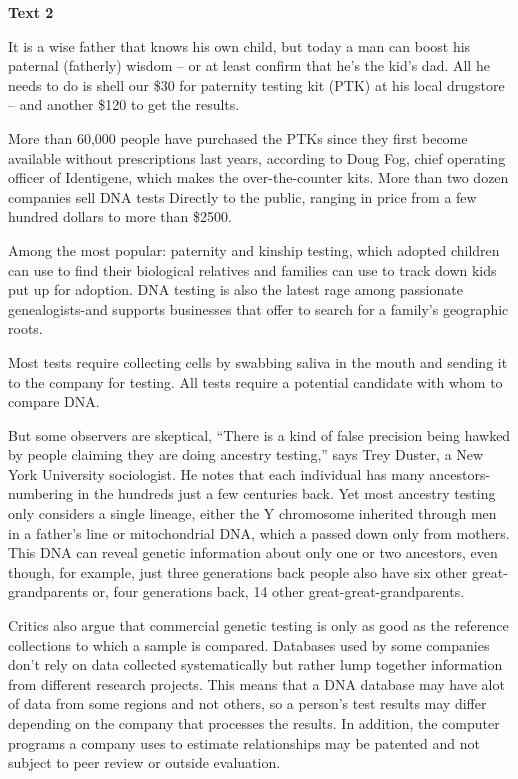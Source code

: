 
\begin{center}\textbf{Text 2}\end{center}

\qquad It is a wise father that knows his own child, but today a man can boost his paternal (fatherly) wisdom – or at least confirm that he's the kid's dad. All he needs to do is shell our \$30 for paternity testing kit (PTK) at his local drugstore – and another \$120 to get the results.

\qquad More than 60,000 people have purchased the PTKs since they first become available without prescriptions last years, according to Doug Fog, chief operating officer of Identigene, which makes the over-the-counter kits. More than two dozen companies sell DNA tests Directly to the public, ranging in price from a few hundred dollars to more than \$2500.

\qquad Among the most popular: paternity and kinship testing, which adopted children can use to find their biological relatives and families can use to track down kids put up for adoption. DNA testing is also the latest rage among passionate genealogists-and supports businesses that offer to search for a family's geographic roots.

\qquad Most tests require collecting cells by swabbing saliva in the mouth and sending it to the company for testing.  All tests require a potential candidate with whom to compare DNA.

\qquad But some observers are skeptical, ``There is a kind of false precision being hawked by people claiming they are doing ancestry testing,'' says Trey Duster, a New York University sociologist. He notes that each individual has many ancestors-numbering in the hundreds just a few centuries back. Yet most ancestry testing only considers a single lineage, either the Y chromosome inherited through men in a father's line or mitochondrial DNA, which a passed down only from mothers. This DNA can reveal genetic information about only one or two ancestors, even though, for example, just three generations back people also have six other great-grandparents or, four generations back, 14 other great-great-grandparents.

\qquad Critics also argue that commercial genetic testing is only as good as the reference collections to which a sample is compared. Databases used by some companies don't rely on data collected systematically but rather lump together information from different research projects. This means that a DNA database may have alot of data from some regions and not others, so a person's test results may differ depending on the company that processes the results. In addition, the computer programs a company uses to estimate relationships may be patented and not subject to peer review or outside evaluation.

